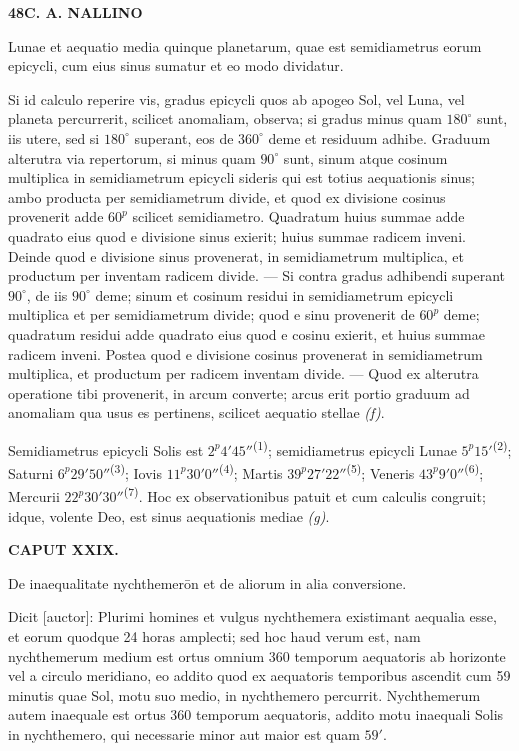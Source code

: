 \documentclass[10pt]{article}
\newcommand{\A}[1]{\hypertarget{#1}{}}
\newcommand{\NM}[1]{\textsuperscript{(#1)}}
\newcommand{\SP}[3]{%
  \clearpage
  \A{AB01-PDF#1}%
  \begin{center}\textbf{#2\quad #3}\end{center}%
}
\begin{document}
\SP{0137}{48}{C. A. NALLINO}

\A{AB01-PDF0137-P01}
Lunae et aequatio media quinque planetarum, quae est
semidiametrus eorum epicycli, cum eius sinus sumatur et eo
modo dividatur.

\A{AB01-PDF0137-P02}
Si id calculo reperire vis, gradus epicycli quos ab apogeo
Sol, vel Luna, vel planeta percurrerit, scilicet anomaliam,
observa; si gradus minus quam $180^\circ$ sunt, iis utere,
sed si $180^\circ$ superant, eos de $360^\circ$ deme et
residuum adhibe. Graduum alterutra via repertorum, si minus
quam $90^\circ$ sunt, sinum atque cosinum multiplica in
semidiametrum epicycli sideris qui est totius aequationis
sinus; ambo producta per semidiametrum divide, et quod ex
divisione cosinus provenerit adde $60^{p}$ scilicet
semidiametro. Quadratum huius summae adde quadrato eius
quod e divisione sinus exierit; huius summae radicem inveni.
Deinde quod e divisione sinus provenerat, in semidiametrum
multiplica, et productum per inventam radicem divide.
— Si contra gradus adhibendi superant $90^\circ$, de iis
$90^\circ$ deme; sinum et cosinum residui in semidiametrum
epicycli multiplica et per semidiametrum divide; quod e
sinu provenerit de $60^{p}$ deme; quadratum residui adde
quadrato eius quod e cosinu exierit, et huius summae
radicem inveni. Postea quod e divisione cosinus provenerat
in semidiametrum multiplica, et productum per radicem
inventam divide. — Quod ex alterutra operatione tibi
provenerit, in arcum converte; arcus erit portio graduum
ad anomaliam qua usus es pertinens, scilicet aequatio
stellae \textit{(f)}.

\A{AB01-PDF0137-P03}
Semidiametrus epicycli Solis est $2^{p}4'45''$\NM{1};
semidiametrus epicycli Lunae $5^{p}15'$\NM{2};
Saturni $6^{p}29'50''$\NM{3}; Iovis $11^{p}30'0''$\NM{4};
Martis $39^{p}27'22''$\NM{5}; Veneris $43^{p}9'0''$\NM{6};
Mercurii $22^{p}30'30''$\NM{7}.
Hoc ex observationibus patuit et cum calculis congruit;
idque, volente Deo, est sinus aequationis mediae \textit{(g)}.

\A{AB01-PDF0137-H01}
\begin{center}
\textbf{CAPUT XXIX.}\par
De inaequalitate nychthemerōn et de aliorum in alia conversione.
\end{center}

\A{AB01-PDF0137-P04}
Dicit [auctor]: Plurimi homines et vulgus nychthemera
existimant aequalia esse, et eorum quodque 24 horas amplecti;
sed hoc haud verum est, nam nychthemerum medium est ortus
omnium 360 temporum aequatoris ab horizonte vel a circulo
meridiano, eo addito quod ex aequatoris temporibus ascendit
cum 59 minutis quae Sol, motu suo medio, in nychthemero
percurrit. Nychthemerum autem inaequale est ortus 360
temporum aequatoris, addito motu inaequali Solis in
nychthemero, qui necessarie minor aut maior est quam $59'$.
\end{document}
